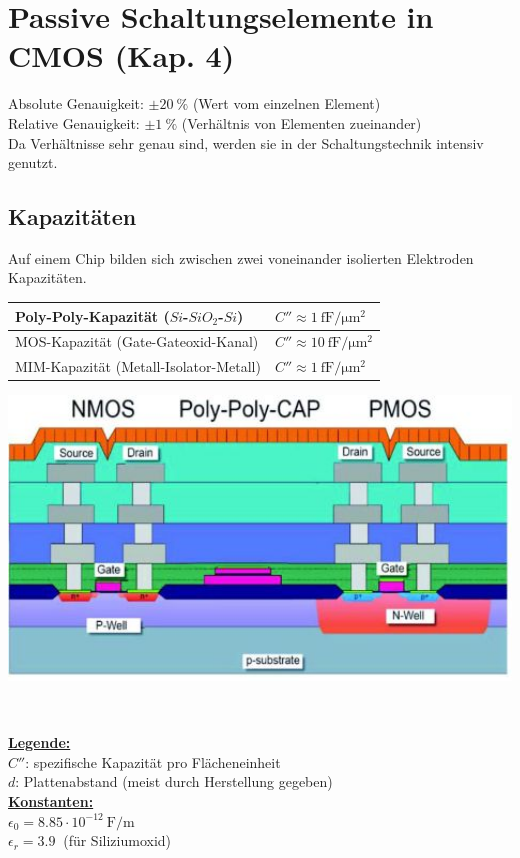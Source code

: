 \section{Passive Schaltungselemente in CMOS (Kap. 4)}
\begin{minipage}[c]{0.59\textwidth}
	Absolute Genauigkeit: $\pm \SI{20}{\percent}$ (Wert vom einzelnen Element)\\
	Relative Genauigkeit: $\pm \SI{1}{\percent}$ (Verhältnis von Elementen zueinander) \\
	Da Verhältnisse sehr genau sind, werden sie in der Schaltungstechnik intensiv genutzt. 
	\subsection{Kapazitäten}
	Auf einem Chip bilden sich zwischen zwei voneinander isolierten Elektroden Kapazitäten. \\
	\begin{tabular}{|l|l|}
		\hline
		Poly-Poly-Kapazität ($Si$-$SiO_2$-$Si$) & $C'' \approx \SI{1}{\femto \farad \per \micro \meter ^2}$\\ \hline
		MOS-Kapazität (Gate-Gateoxid-Kanal) & $C'' \approx \SI{10}{\femto \farad \per \micro \meter ^2}$\\ \hline
		MIM-Kapazität (Metall-Isolator-Metall) & $C'' \approx \SI{1}{\femto \farad \per \micro \meter ^2}$ \\ \hline
	\end{tabular}
\end{minipage}
\begin{minipage}[c]{0.41\textwidth}
	\includegraphics[width=1\textwidth, right]{chapters/Technologie/images/Prozess}
\end{minipage} \\ [1ex]
\begin{minipage}[c]{0.45\textwidth}
	\uline{\textbf{Legende:}}\\
	$C''$: spezifische Kapazität pro Flächeneinheit\\
	$d$:   Plattenabstand (meist durch Herstellung gegeben) \\
	\uline{\textbf{Konstanten:}}\\
	$\epsilon_0 = 8.85 \cdot 10^{-12} \SI{}{\farad / \meter}$\\
	$\epsilon_r = \SI{3.9}{}$ (für Siliziumoxid)
\end{minipage}
